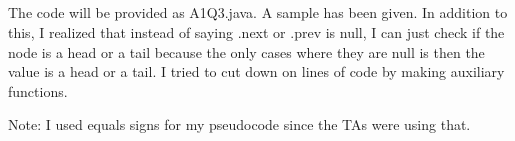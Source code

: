 \documentclass{article}
\begin{document}
    \subsection{}
        The code will be provided as A1Q3.java. A sample has been given. In addition to this, I realized that instead of saying .next or .prev is null, I can just check if the node is a head or a tail because the only cases where they are null is then the value is a head or a tail. I tried to cut down on lines of code by making auxiliary functions.
        
\State Note: I used equals signs for my pseudocode since the TAs were using that. 
\end{document}
